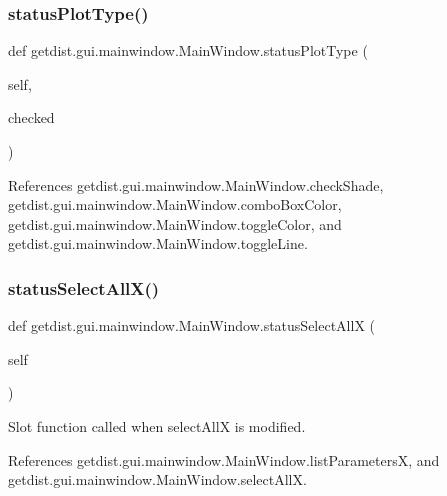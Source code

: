 \subsubsection{\texorpdfstring{status\+Plot\+Type()}{statusPlotType()}}
{\footnotesize\ttfamily def getdist.\+gui.\+mainwindow.\+Main\+Window.\+status\+Plot\+Type (\begin{DoxyParamCaption}\item[{}]{self,  }\item[{}]{checked }\end{DoxyParamCaption})}



References getdist.\+gui.\+mainwindow.\+Main\+Window.\+check\+Shade, getdist.\+gui.\+mainwindow.\+Main\+Window.\+combo\+Box\+Color, getdist.\+gui.\+mainwindow.\+Main\+Window.\+toggle\+Color, and getdist.\+gui.\+mainwindow.\+Main\+Window.\+toggle\+Line.

\mbox{\label{classgetdist_1_1gui_1_1mainwindow_1_1MainWindow_a82e1f04eb7fe2998e71eabd5db7e4a21}} 
\subsubsection{\texorpdfstring{status\+Select\+All\+X()}{statusSelectAllX()}}
{\footnotesize\ttfamily def getdist.\+gui.\+mainwindow.\+Main\+Window.\+status\+Select\+AllX (\begin{DoxyParamCaption}\item[{}]{self }\end{DoxyParamCaption})}

\begin{DoxyVerb}Slot function called when selectAllX is modified.
\end{DoxyVerb}
 

References getdist.\+gui.\+mainwindow.\+Main\+Window.\+list\+ParametersX, and getdist.\+gui.\+mainwindow.\+Main\+Window.\+select\+AllX.

\mbox{\label{classgetdist_1_1gui_1_1mainwindow_1_1MainWindow_ac190624a78b6fa51938e90ae5905339b}} 
